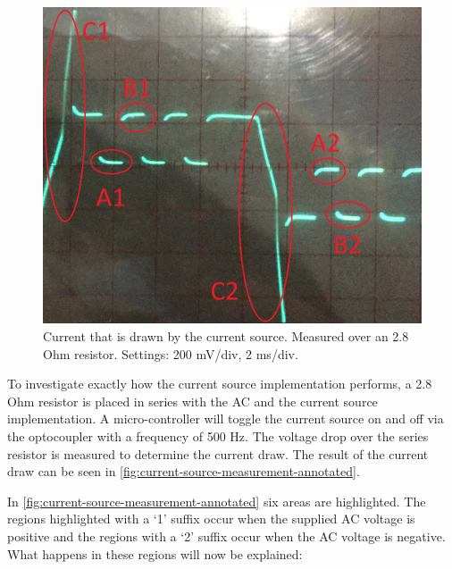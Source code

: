 \begin{figure}[h]
\begin{minipage}[b]{0.49\textwidth}
			\includegraphics[width=\textwidth]{chapters/hardware-chapters/AC/ac-modulator/custom-hardware/ac-current-source/current-source-measurement-annotated.png}
			\caption{Current that is drawn by the current source. Measured over an 2.8 Ohm resistor. Settings: 200 mV/div, 2 ms/div.}
			\label{fig:current-source-measurement-annotated}
		\end{minipage}
	\end{figure}




	To investigate exactly how the current source implementation performs, a 2.8 Ohm resistor is placed in series with the AC and the current source implementation.
	A micro-controller will toggle the current source on and off via the optocoupler with a frequency of 500 Hz.
	The voltage drop over the series resistor is measured to determine the current draw.
	The result of the current draw can be seen in \autoref{fig:current-source-measurement-annotated}.

	


	In \autoref{fig:current-source-measurement-annotated} six areas are highlighted.
	The regions highlighted with a `1' suffix occur when the supplied AC voltage is positive and the regions with a `2' suffix occur when the AC voltage is negative.
	What happens in these regions will now be explained:


